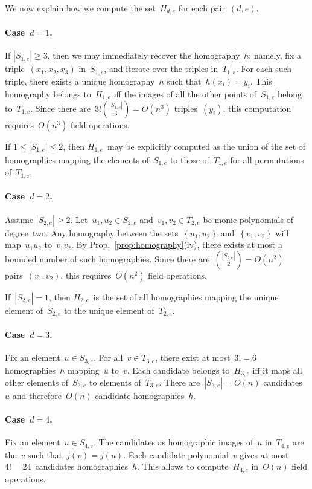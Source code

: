 \documentclass{lms}%
\def\acco#1{\left\{#1\right\}}
\def\abs#1{\left|#1\right|}
\def\card#1{\abs{#1}}
\begin{document}
\bigbreak
We now explain how we compute the set~$H_{d,e}$ for each pair~$(d,e)$.

\paragraph{Case~$d = 1$.}
If $\card{S_{1,e}} ≥ 3$, then we may immediately recover the
homography~$h$: namely, fix a triple~$(x_1,x_2,x_3)$ in~$S_{1,e}$, and
iterate over the triples in~$T_{1,e}$. For each such triple, there exists
a unique homography~$h$ such that~$h(x_i) = y_i$. This homography belongs
to~$H_{1,e}$ iff the images of all the other points of~$S_{1,e}$ belong
to~$T_{1,e}$. Since there are~$3!\binom{\card{S_{1,e}}}{3} = O(n^3)$
triples~$(y_i)$, this computation requires~$O(n^3)$ field operations.

If $1 ≤ \card{S_{1,e}} ≤ 2$, then $H_{1,e}$~may be explicitly computed as
the union of the set of homographies mapping the elements of~$S_{1,e}$ to
those of~$T_{1,e}$ for all permutations of~$T_{1,e}$.

\paragraph{Case~$d = 2$.}
Assume $\card{S_{2,e}} ≥ 2$. Let~$u_1, u_2 ∈ S_{2,e}$ and~$v_1, v_2 ∈
T_{2,e}$ be monic polynomials of degree~two. Any homography between the
sets~$\acco{u_1, u_2}$ and~$\acco{v_1, v_2}$ will map~$u_1 u_2$ to~$v_1
v_2$. By Prop.~\ref{prop:homography}(iv), there exists at most a bounded
number of such homographies. Since there are~$\binom{\card{S_{2,e}}}{2} =
O(n^2)$ pairs~$(v_1, v_2)$, this requires~$O(n^2)$ field operations.

If~$\card{S_{2,e}} = 1$, then $H_{2,e}$~is the set of all homographies
mapping the unique element of~$S_{2,e}$ to the unique element
of~$T_{2,e}$.

\paragraph{Case~$d = 3$.}
Fix an element~$u ∈ S_{3,e}$. For all~$v ∈ T_{3,e}$, there exist at
most~$3! = 6$ homographies~$h$ mapping~$u$ to~$v$. Each candidate belongs
to~$H_{3,e}$ iff it maps all other elements of~$S_{3,e}$ to elements
of~$T_{3,e}$. There are~$\card{S_{3,e}} = O(n)$ candidates~$u$ and
therefore~$O(n)$ candidate homographies~$h$.

\paragraph{Case~$d = 4$.}
Fix an element~$u ∈ S_{4,e}$. The candidates as homographic images of~$u$
in~$T_{4,e}$ are the~$v$ such that~$j(v) = j(u)$. Each candidate
polynomial~$v$ gives at most $4! = 24$~candidates homographies~$h$. This
allows to compute~$H_{4,e}$ in~$O(n)$ field operations.
\end{document}
